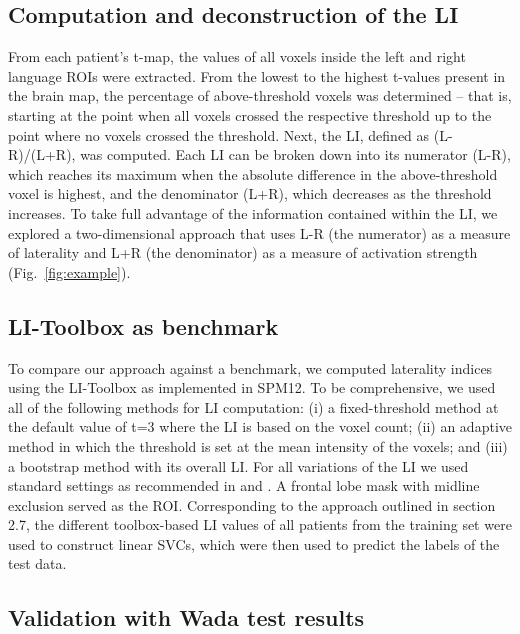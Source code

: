 \documentclass[fleqn,10pt]{SelfArx} %
\begin{document}
\subsection{Computation and deconstruction of the LI}
From each patient’s t-map, the values of all voxels inside the left and right language ROIs were extracted. From the lowest to the highest t-values present in the brain map, the percentage of above-threshold voxels was determined – that is, starting at the point when all voxels crossed the respective threshold up to the point where no voxels crossed the threshold. Next, the LI, defined as (L-R)/(L+R), was computed. Each LI can be broken down into its numerator (L-R), which reaches its maximum when the absolute difference in the above-threshold voxel is highest, and the denominator (L+R), which decreases as the threshold increases. To take full advantage of the information contained within the LI, we explored a two-dimensional approach that uses L-R (the numerator) as a measure of laterality and L+R (the denominator) as a measure of activation strength (Fig.~\ref{fig:example}). 

\subsection{LI-Toolbox as benchmark}
To compare our approach against a benchmark, we computed laterality indices using the LI-Toolbox \citep{Wilke_2007} as implemented in SPM12. To be comprehensive, we used all of the following methods for LI computation: (i) a fixed-threshold method at the default value of t=3 where the LI is based on the voxel count; (ii) an adaptive method in which the threshold is set at the mean intensity of the voxels; and (iii) a bootstrap method with its overall LI. For all variations of the LI we used standard settings as recommended in \citet{Wilke_2007} and \citet{Wilke_2006}. A frontal lobe mask with midline exclusion served as the ROI. Corresponding to the approach outlined in section 2.7, the different toolbox-based LI values of all patients from the training set were used to construct linear SVCs, which were then used to predict the labels of the test data.

\subsection{Validation with Wada test results}
\end{document}
